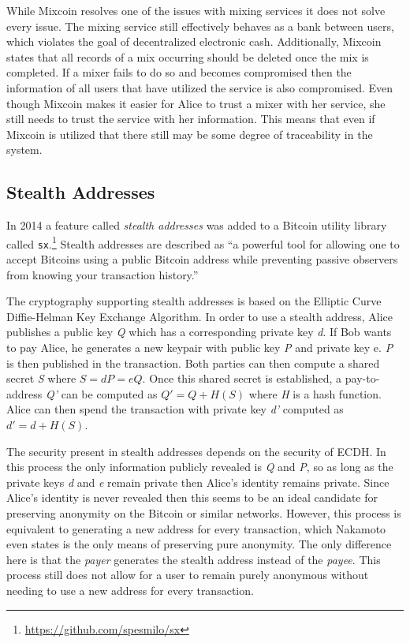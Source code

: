 \documentclass[11pt]{article}
\begin{document}
While Mixcoin resolves one of the issues with mixing services it does not solve every issue. The mixing service
still effectively behaves as a bank between users, which violates the goal of decentralized electronic cash.
Additionally, Mixcoin states that all records of a mix occurring should be deleted once the mix is completed. If
a mixer fails to do so and becomes compromised then the information of all users that have utilized the service
is also compromised.  Even though Mixcoin makes it easier for Alice to trust a mixer with her service, she still
needs to trust the service with her information. This means that even if Mixcoin is utilized that there still
may be some degree of traceability in the system.

\subsection{Stealth Addresses}
In 2014 a feature called \emph{stealth addresses} was added to a Bitcoin utility library called
\texttt{sx}.\footnote{\url{https://github.com/spesmilo/sx}} Stealth addresses are described as ``a powerful tool for
allowing one to accept Bitcoins using a public Bitcoin address while preventing passive observers from knowing your
transaction history.''\cite{stealth}

The cryptography supporting stealth addresses is based on the Elliptic Curve Diffie-Helman Key Exchange
Algorithm. In order to use a stealth address, Alice publishes a public key \emph{Q} which has a corresponding
private key \emph{d}. If Bob wants to pay Alice, he generates a new keypair with public key \emph{P} and private
key {e}. \emph{P} is then published in the transaction. Both parties can then compute a shared secret \emph{S}
where $S = dP = eQ$. Once this shared secret is established, a pay-to-address \emph{Q'} can be computed as $Q' =
Q + H(S)$ where \emph{H} is a hash function. Alice can then spend the transaction with private key \emph{d'}
computed as $d' = d + H(S)$.

The security present in stealth addresses depends on the security of ECDH. In this process the only information
publicly revealed is \emph{Q} and \emph{P}, so as long as the private keys \emph{d} and \emph{e} remain private
then Alice's identity remains private. Since Alice's identity is never revealed then this seems to be an ideal candidate
for preserving anonymity on the Bitcoin or similar networks. However, this process is equivalent to generating a new
address for every transaction, which Nakamoto even states is the only means of preserving pure
anonymity.\cite{nakamoto08} The only difference here is that the \emph{payer} generates the stealth address instead of
the \emph{payee}. This process still does not allow for a user to remain purely anonymous without needing to use a new
address for every transaction.
\end{document}
